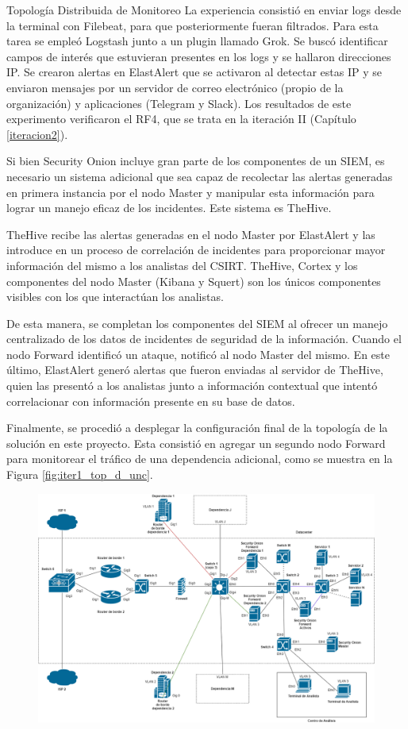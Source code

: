 \begin{subsection}{Topología Distribuida de Monitoreo}
    La experiencia consistió en enviar logs desde la terminal con Filebeat, para que posteriormente fueran filtrados. Para esta tarea se empleó Logstash junto a un plugin llamado Grok. Se buscó identificar campos de interés que estuvieran presentes en los logs y se hallaron direcciones IP. Se crearon alertas en ElastAlert que se activaron al detectar estas IP y se enviaron mensajes por un servidor de correo electrónico (propio de la organización) y aplicaciones (Telegram y Slack). Los resultados de este experimento verificaron el RF4, que se trata en la iteración II (Capítulo \ref{iteracion2}). \par
    Si bien Security Onion incluye gran parte de los componentes de un SIEM, es necesario un sistema adicional que sea capaz de recolectar las alertas generadas en primera instancia por el nodo Master y manipular esta información para lograr un manejo eficaz de los incidentes. Este sistema es TheHive. \par
    TheHive recibe las alertas generadas en el nodo Master por ElastAlert y las introduce en un proceso de correlación de incidentes para proporcionar mayor información del mismo a los analistas del CSIRT. TheHive, Cortex y los componentes del nodo Master (Kibana y Squert) son los únicos componentes visibles con los que interactúan los analistas. \par
    De esta manera, se completan los componentes del SIEM al ofrecer un manejo centralizado de los datos de incidentes de seguridad de la información. Cuando el nodo Forward identificó un  ataque, notificó al nodo Master del mismo. En este último, ElastAlert generó alertas que fueron enviadas al servidor de TheHive, quien las presentó a los analistas junto a información contextual que intentó correlacionar con información presente en su base de datos.\par
    Finalmente, se procedió a desplegar la configuración final de la topología de la solución en este proyecto. Esta consistió en agregar un segundo nodo Forward para monitorear el tráfico de una dependencia adicional, como se muestra en la Figura \ref{fig:iter1_top_d_unc}.
    \begin{figure}[H]
    \centering
    \includegraphics[width=1\textwidth]{./iteracion_1_imagenes/figura_topologia_d_unc.png}

\end{figure}
\end{subsection}
